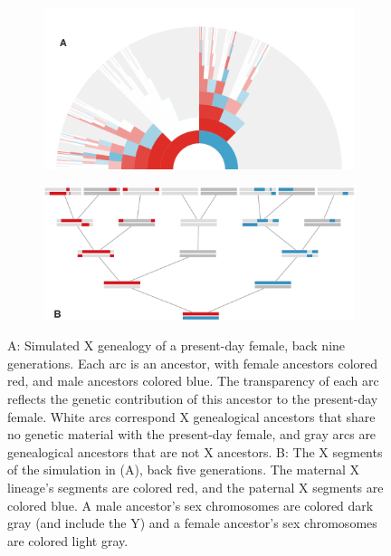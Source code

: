 \documentclass[11pt]{article}
\begin{document}
\begin{figure}[!ht]
    \centering
    \begin{subfigure}[b]{0.8\textwidth}
      \includegraphics[width=\textwidth]{images/x-arc}
    \end{subfigure}
    \begin{subfigure}[b]{0.8\textwidth}
      \includegraphics[width=\textwidth]{images/x-tree}
    \end{subfigure}
    
    \caption{A: Simulated X genealogy of a present-day female, back nine
      generations.  Each arc is an ancestor, with female ancestors colored red,
      and male ancestors colored blue. The transparency of each arc reflects
      the genetic contribution of this ancestor to the present-day female.
      White arcs correspond X genealogical ancestors that share no genetic
      material with the present-day female, and gray arcs are genealogical
      ancestors that are not X ancestors. B: The X segments of the simulation
      in (A), back five generations.  The maternal X lineage's segments are
      colored red, and the paternal X segments are colored blue. A male
      ancestor's sex chromosomes are colored dark gray (and include the Y) and
    a female ancestor's sex chromosomes are colored light gray.}

    \label{fig:x-arc}

  \end{figure}
\end{document}
